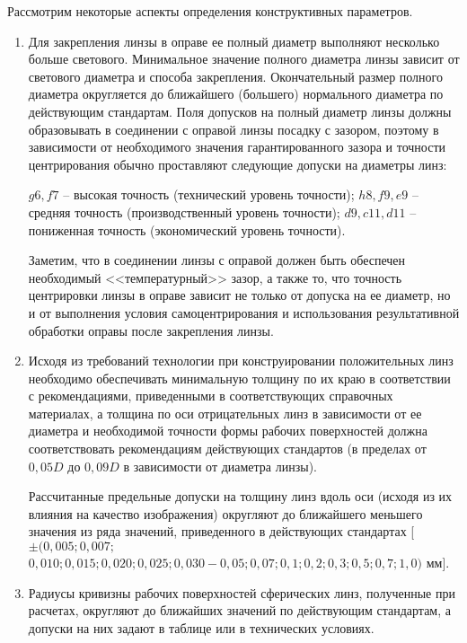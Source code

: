 Рассмотрим некоторые аспекты определения конструктивных параметров.
\begin{enumerate}
	
	\item Для закрепления линзы в оправе ее полный диаметр выполняют несколько больше светового. Минимальное значение полного диаметра линзы зависит от светового диаметра и способа закрепления. Окончательный размер полного диаметра округляется до ближайшего (большего) нормального диаметра по действующим стандартам. Поля допусков на полный диаметр линзы должны образовывать в соединении с оправой линзы посадку с зазором, поэтому в зависимости от необходимого значения гарантированного зазора и точности центрирования обычно проставляют следующие допуски на диаметры линз:
	
	$ g6, f7 $ -- высокая точность (технический уровень точности);
	$ h8, f9, e9 $ -- средняя точность (производственный уровень точности);
	$ d9, c11, d11 $ -- пониженная точность (экономический уровень точности).
	
	Заметим, что в соединении линзы с оправой должен быть обеспечен необходимый <<температурный>> зазор, а также то, что точность центрировки линзы в оправе зависит не только от допуска на ее диаметр, но и от выполнения условия самоцентрирования и использования результативной обработки оправы после закрепления линзы.
	
	\item Исходя из требований технологии при конструировании положительных линз необходимо обеспечивать минимальную толщину по их краю в соответствии с рекомендациями, приведенными в соответствующих справочных материалах, а толщина по оси отрицательных линз в зависимости от ее диаметра и необходимой точности формы рабочих поверхностей должна соответствовать рекомендациям действующих стандартов (в пределах от $ 0,05D $ до $ 0,09D  $ в зависимости от диаметра линзы).
	
	Рассчитанные предельные допуски на толщину линз вдоль оси (исходя из их влияния на качество изображения) округляют до ближайшего меньшего значения из ряда значений, приведенного в действующих стандартах [$ \pm(0,005; 0,007;$ $0,010; 0,015; 0,020; 0,025; 0,030-0,05; 0,07; 0,1; 0,2; 0,3; 0,5; 0,7; 1,0) $ мм].
	
	\item Радиусы кривизны рабочих поверхностей сферических линз, полученные при расчетах, округляют до ближайших значений по действующим стандартам, а допуски на них задают в таблице или в технических условиях.
	

\end{enumerate}
